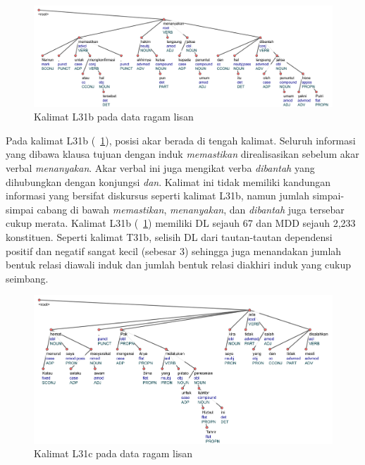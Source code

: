 \begin{figure}
	\centering \includegraphics[width=1
	\textwidth] {pics/ls16.jpg} 
	\caption{Kalimat L31b pada data ragam lisan}
	\label{fig:ls16} 
\end{figure}

Pada kalimat L31b (\pic~\ref{fig:ls16}), posisi akar berada di tengah kalimat. Seluruh informasi yang dibawa klausa tujuan dengan induk \textit{memastikan} direalisasikan sebelum akar verbal \textit{menanyakan}. Akar verbal ini juga mengikat verba \textit{dibantah} yang dihubungkan dengan konjungsi \textit{dan}. Kalimat ini tidak memiliki kandungan informasi yang bersifat diskursus seperti kalimat L31b, namun jumlah simpai-simpai cabang di bawah \textit{memastikan}, \textit{menanyakan}, dan \textit{dibantah} juga tersebar cukup merata. Kalimat L31b (\pic~\ref{fig:ls16}) memiliki DL sejauh 67 dan MDD sejauh 2,233 konstituen. Seperti kalimat T31b, selisih DL dari tautan-tautan dependensi positif dan negatif sangat kecil (sebesar 3) sehingga juga menandakan jumlah bentuk relasi diawali induk dan jumlah bentuk relasi diakhiri induk yang cukup seimbang. 

\begin{figure}
	\centering \includegraphics[width=1
	\textwidth] {pics/ls114.jpg} 
	\caption{Kalimat L31c pada data ragam lisan}
	\label{fig:ls114} 
\end{figure}

